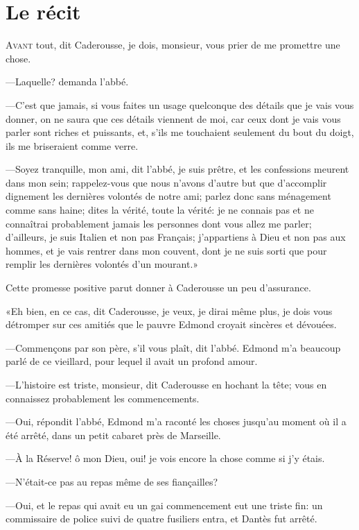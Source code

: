\chapter{Le récit}

\lettrine[ante=«]{A}{vant} tout, dit Caderousse, je dois, monsieur, vous prier de me promettre une chose.

\zz
—Laquelle? demanda l'abbé.

\zz
—C'est que jamais, si vous faites un usage quelconque des détails que je vais vous donner, on ne saura que ces détails viennent de moi, car ceux dont je vais vous parler sont riches et puissants, et, s'ils me touchaient seulement du bout du doigt, ils me briseraient comme verre.

—Soyez tranquille, mon ami, dit l'abbé, je suis prêtre, et les confessions meurent dans mon sein; rappelez-vous que nous n'avons d'autre but que d'accomplir dignement les dernières volontés de notre ami; parlez donc sans ménagement comme sans haine; dites la vérité, toute la vérité: je ne connais pas et ne connaîtrai probablement jamais les personnes dont vous allez me parler; d'ailleurs, je suis Italien et non pas Français; j'appartiens à Dieu et non pas aux hommes, et je vais rentrer dans mon couvent, dont je ne suis sorti que pour remplir les dernières volontés d'un mourant.»

Cette promesse positive parut donner à Caderousse un peu d'assurance.

«Eh bien, en ce cas, dit Caderousse, je veux, je dirai même plus, je dois vous détromper sur ces amitiés que le pauvre Edmond croyait sincères et dévouées.

—Commençons par son père, s'il vous plaît, dit l'abbé. Edmond m'a beaucoup parlé de ce vieillard, pour lequel il avait un profond amour.

—L'histoire est triste, monsieur, dit Caderousse en hochant la tête; vous en connaissez probablement les commencements.

—Oui, répondit l'abbé, Edmond m'a raconté les choses jusqu'au moment où il a été arrêté, dans un petit cabaret près de Marseille.

—À la Réserve! ô mon Dieu, oui! je vois encore la chose comme si j'y étais.

—N'était-ce pas au repas même de ses fiançailles?

—Oui, et le repas qui avait eu un gai commencement eut une triste fin: un commissaire de police suivi de quatre fusiliers entra, et Dantès fut arrêté.


